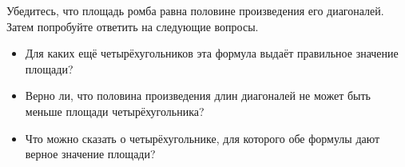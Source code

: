 \documentclass[a4paper,10pt]{article}
\begin{document}
Убедитесь, что площадь ромба равна половине произведения его диагоналей. Затем попробуйте ответить на следующие вопросы.
\begin{itemize}
\item Для каких ещё четырёхугольников эта формула выдаёт правильное значение площади?
\item Верно ли, что половина произведения длин диагоналей не может быть меньше площади четырёхугольника?
\item Что можно сказать о четырёхугольнике, для которого обе формулы дают верное значение площади?
\end{itemize}

{\sloppy
\nocite{*}%
\printbibliography[heading=bibintoc]
\fussy
}
\end{document}
